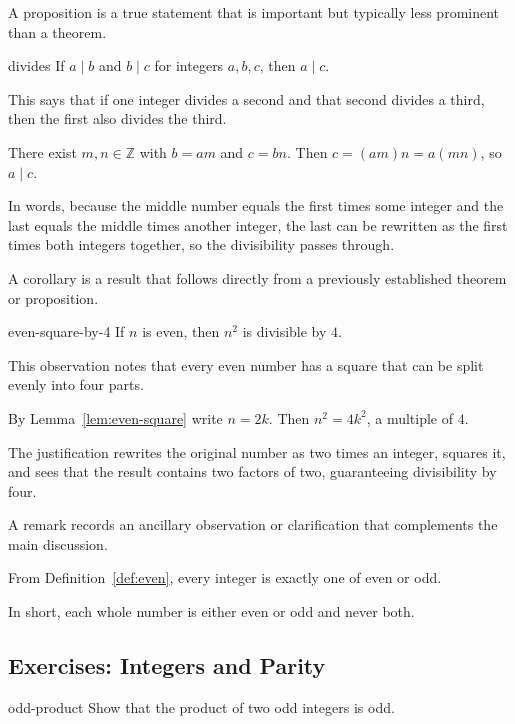 \documentclass[11pt,a4paper]{article}
\begin{document}
A proposition is a true statement that is important but typically less prominent than a theorem.
\begin{proposition}{}{divides}
If $a\mid b$ and $b\mid c$ for integers $a,b,c$, then $a\mid c$.
\end{proposition}
This says that if one integer divides a second and that second divides a third, then the first also divides the third.

\begin{proofbox}{}{}
There exist $m,n\in\mathbb{Z}$ with $b=am$ and $c=bn$. Then $c=(am)n=a(mn)$, so $a\mid c$.
\end{proofbox}
In words, because the middle number equals the first times some integer and the last equals the middle times another integer, the last can be rewritten as the first times both integers together, so the divisibility passes through.

A corollary is a result that follows directly from a previously established theorem or proposition.
\begin{corollary}{}{even-square-by-4}
If $n$ is even, then $n^2$ is divisible by $4$.
\end{corollary}
This observation notes that every even number has a square that can be split evenly into four parts.

\begin{proofbox}{}{}
By Lemma~\ref{lem:even-square} write $n=2k$. Then $n^2=4k^2$, a multiple of $4$.
\end{proofbox}
The justification rewrites the original number as two times an integer, squares it, and sees that the result contains two factors of two, guaranteeing divisibility by four.

A remark records an ancillary observation or clarification that complements the main discussion.
\begin{remark}
From Definition~\ref{def:even}, every integer is exactly one of even or odd.
\end{remark}
In short, each whole number is either even or odd and never both.

\subsection*{Exercises: Integers and Parity}

\begin{exercise}{}{odd-product}
Show that the product of two odd integers is odd.
\end{exercise}
\end{document}
